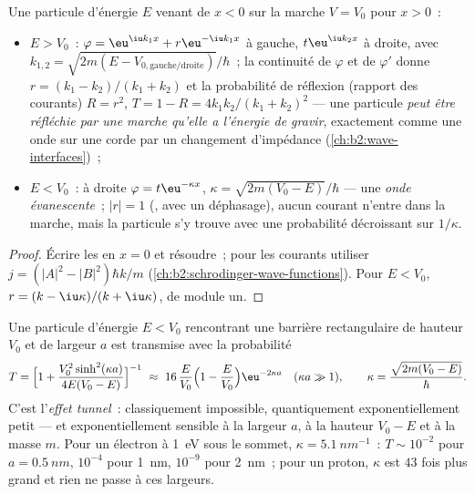 \begin{proposition}\label{prop:b2:potential-wells-tunneling:step}
Une particule d'énergie $E$ venant de $x < 0$ sur la marche $V = V_0$
pour $x > 0$~:
\begin{itemize}
\item $E > V_0$~: $\varphi = \eu^{\iu k_1x} + r\eu^{-\iu k_1x}$ à gauche, $t\eu^{\iu
      k_2x}$ à droite, avec $k_{1,2} = \sqrt{2m(E - V_{0,\text{gauche/droite}})}/
      \hbar$~; la continuité de $\varphi$ et de $\varphi'$ donne $r = (k_1 - k_2)/(k_1
      + k_2)$ et la probabilité de réflexion (rapport des courants) $R = r^2$,
      $T = 1 - R = 4k_1k_2/(k_1 + k_2)^2$ --- une particule \emph{peut être
      réfléchie par une marche qu'elle a l'énergie de gravir}, exactement comme une onde sur
      une corde par un changement d'impédance (\cref{ch:b2:wave-interfaces})~;
\item $E < V_0$~: à droite $\varphi = t\eu^{-\kappa x}$, $\kappa = \sqrt{2m(V_0
      - E)}/\hbar$ --- une \emph{onde évanescente}~; $|r| = 1$ (, avec un déphasage), aucun
      courant n'entre dans la marche, mais la particule s'y trouve avec une
      probabilité décroissant sur $1/\kappa$.
\end{itemize}
\end{proposition}

\begin{proof}
Écrire les  en $x = 0$ et résoudre~; pour les courants
utiliser $j = (|A|^2 - |B|^2)\hbar k/m$ (\cref{ch:b2:schrodinger-wave-functions}).
Pour $E < V_0$, $r = (k - \iu\kappa)/(k + \iu\kappa)$, de module un.
\end{proof}

\begin{theorem}\label{thm:b2:potential-wells-tunneling:tunnel}
Une particule d'énergie $E < V_0$ rencontrant une barrière rectangulaire de hauteur
$V_0$ et de largeur $a$ est transmise avec la probabilité
\[
T = \Big[1 + \frac{V_0^2\sinh^2(\kappa a)}{4E(V_0 - E)}\Big]^{-1}
\ \approx\ 16\,\frac{E}{V_0}\Big(1 - \frac{E}{V_0}\Big)\eu^{-2\kappa a}
\quad (\kappa a \gg 1), \qquad
\kappa = \frac{\sqrt{2m(V_0 - E)}}{\hbar} .
\]
C'est l'\emph{effet tunnel}~: classiquement
impossible, quantiquement exponentiellement petit --- et
exponentiellement sensible à la largeur $a$, à la hauteur $V_0 - E$ et à la
masse $m$. Pour un électron à \qty{1}{eV} sous le sommet, $\kappa = \qty{5.1}{nm^{-1}}$~:
$T \sim 10^{-2}$ pour $a = \qty{0.5}{nm}$, $10^{-4}$ pour \qty{1}{nm}, $10^{-9}$ pour
\qty{2}{nm}~; pour un proton, $\kappa$ est $43$ fois plus grand et rien ne passe
à ces largeurs.
\end{theorem}

